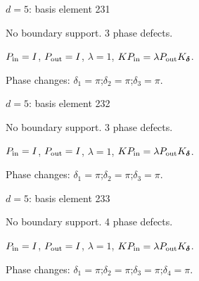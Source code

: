 \vfill
{\footnotesize\texttt{}}
\newpage
{}
{\Large $d=5$: basis element 231}\par
No boundary support. 3 phase defects.
\begin{center}
\end{center}
\vspace{-1mm}
$P_{\rm in}=I$, \quad $P_{\rm out}=I$, \quad $\lambda=1$, \qquad $K P_{\rm in}=\lambda P_{\rm out}K_{\boldsymbol\delta}$.
\par\smallskip\begin{minipage}{.98\linewidth}\small Phase changes: $\delta_{1}=\pi$;\quad $\delta_{2}=\pi$;\quad $\delta_{3}=\pi$.\end{minipage}
\vfill
{\footnotesize\texttt{}}
\newpage
{}
{\Large $d=5$: basis element 232}\par
No boundary support. 3 phase defects.
\begin{center}
\end{center}
\vspace{-1mm}
$P_{\rm in}=I$, \quad $P_{\rm out}=I$, \quad $\lambda=1$, \qquad $K P_{\rm in}=\lambda P_{\rm out}K_{\boldsymbol\delta}$.
\par\smallskip\begin{minipage}{.98\linewidth}\small Phase changes: $\delta_{1}=\pi$;\quad $\delta_{2}=\pi$;\quad $\delta_{3}=\pi$.\end{minipage}
\vfill
{\footnotesize\texttt{}}
\newpage
{}
{\Large $d=5$: basis element 233}\par
No boundary support. 4 phase defects.
\begin{center}
\end{center}
\vspace{-1mm}
$P_{\rm in}=I$, \quad $P_{\rm out}=I$, \quad $\lambda=1$, \qquad $K P_{\rm in}=\lambda P_{\rm out}K_{\boldsymbol\delta}$.
\par\smallskip\begin{minipage}{.98\linewidth}\small Phase changes: $\delta_{1}=\pi$;\quad $\delta_{2}=\pi$;\quad $\delta_{3}=\pi$;\quad $\delta_{4}=\pi$.\end{minipage}
\vfill
{\footnotesize\texttt{}}
\newpage
{}
